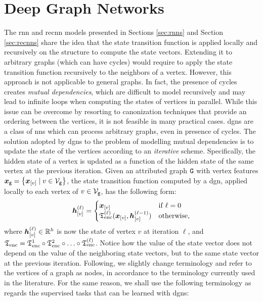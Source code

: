 \section{Deep Graph Networks} \label{sec:dgns}
The \gls{rnn} and \gls{recnn} models presented in Sections \ref{sec:rnns} and Section \ref{sec:recnns} share the idea that the state transition function is applied locally and recursively on the structure to compute the state vectors. Extending it to arbitrary graphs (which can have cycles) would require to apply the state transition function recursively to the neighbors of a vertex. However, this approach is not applicable to general graphs. In fact, the presence of cycles creates \emph{mutual dependencies}, which are difficult to model recursively and may lead to infinite loops when computing the states of vertices in parallel. While this issue can be overcome by resorting to canonization techniques that provide an ordering between the vertices, it is not feasible in many practical cases. \glspl{dgn} are a class of \glspl{nn} which can process arbitrary graphs, even in presence of cycles. The solution adopted by \glspl{dgn} to the problem of modelling mutual dependencies is to update the state of the vertices according to an \emph{iterative} scheme. Specifically, the hidden state of a vertex is updated as a function of the hidden state of the same vertex at the previous iteration. Given an attributed graph $\GraphU{g}$ with vertex features $\GraphFeatures{x}{g} = \Set{\Elem{x}{v} \mid v \in \Nodes{g}}$, the state transition function computed by a \gls{dgn}, applied locally to each vertex of $v \in \Nodes{g}$, has the following form:
\begin{align*}
    \StateVector{v}{\ell}=
    \begin{cases}
        \Elem{x}{v} & \mathrm{if}\; \ell = 0\\
        \EncTrans^{(\ell)}(\Elem{x}{v}, \StateVector{v}{\ell-1}) & \mathrm{otherwise},
    \end{cases}
\end{align*}
where $\StateVector{v}{\ell} \in \Real^h$ is now the state of vertex $v$ at iteration $\ell$, and $\mathfrak{T}_{\mathrm{enc}} = \mathfrak{T}_{\mathrm{enc}}^{1} \circ \mathfrak{T}_{\mathrm{enc}}^{2} \circ \ldots \circ \mathfrak{T}_{\mathrm{enc}}^{(\ell)}$. Notice how the value of the state vector does not depend on the value of the neighboring state vectors, but to the same state vector at the previous iteration. Following, we slightly change terminology and refer to the vertices of a graph as nodes, in accordance to the terminology currently used in the literature. For the same reason, we shall use the following terminology as regards the supervised tasks that can be learned with \glspl{dgn}:
